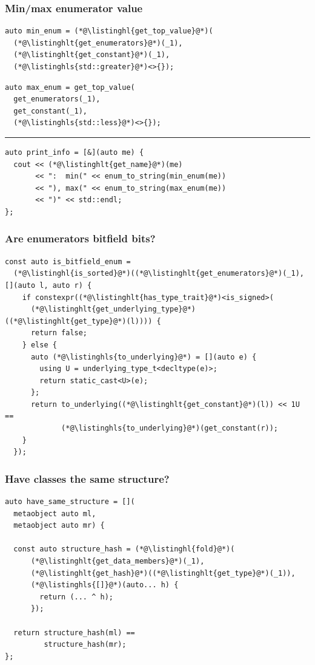 \documentclass[aspectratio=169,compress,table,xcolor=table]{beamer}
\begin{document}
\begin{frame}[fragile]
  \frametitle{Min/max enumerator value}
  \begin{lstlisting}[language=c++2x,basicstyle=\footnotesize\ttfamily]
auto min_enum = (*@\listinghl{get_top_value}@*)(
  (*@\listinghlt{get_enumerators}@*)(_1),
  (*@\listinghlt{get_constant}@*)(_1),
  (*@\listinghls{std::greater}@*)<>{});
  \end{lstlisting}
  \vfill
  \begin{lstlisting}[language=c++2x,basicstyle=\footnotesize\ttfamily]
auto max_enum = get_top_value(
  get_enumerators(_1),
  get_constant(_1),
  (*@\listinghls{std::less}@*)<>{});
  \end{lstlisting}
  \hrule
  \vfill
  \begin{lstlisting}[language=c++2x,basicstyle=\footnotesize\ttfamily]
auto print_info = [&](auto me) {
  cout << (*@\listinghlt{get_name}@*)(me)
       << ":  min(" << enum_to_string(min_enum(me))
       << "), max(" << enum_to_string(max_enum(me))
       << ")" << std::endl;
};
  \end{lstlisting}
\end{frame}
\begin{frame}[fragile]
  \frametitle{Are enumerators bitfield bits?}
  \begin{lstlisting}[language=c++2x,basicstyle=\footnotesize\ttfamily]
const auto is_bitfield_enum =
  (*@\listinghl{is_sorted}@*)((*@\listinghlt{get_enumerators}@*)(_1), [](auto l, auto r) {
    if constexpr((*@\listinghlt{has_type_trait}@*)<is_signed>(
      (*@\listinghlt{get_underlying_type}@*)((*@\listinghlt{get_type}@*)(l)))) {
      return false;
    } else {
      auto (*@\listinghls{to_underlying}@*) = [](auto e) {
        using U = underlying_type_t<decltype(e)>;
        return static_cast<U>(e);
      };
      return to_underlying((*@\listinghlt{get_constant}@*)(l)) << 1U ==
             (*@\listinghls{to_underlying}@*)(get_constant(r));
    }
  });
  \end{lstlisting}
\end{frame}
\begin{frame}[fragile]
  \frametitle{Have classes the same structure?}
  \begin{lstlisting}[language=c++2x]
auto have_same_structure = [](
  metaobject auto ml,
  metaobject auto mr) {

  const auto structure_hash = (*@\listinghl{fold}@*)(
      (*@\listinghlt{get_data_members}@*)(_1),
      (*@\listinghlt{get_hash}@*)((*@\listinghlt{get_type}@*)(_1)),
      (*@\listinghls{[]}@*)(auto... h) {
        return (... ^ h);
      });

  return structure_hash(ml) ==
         structure_hash(mr);
};
  \end{lstlisting}
\end{frame}
\end{document}
